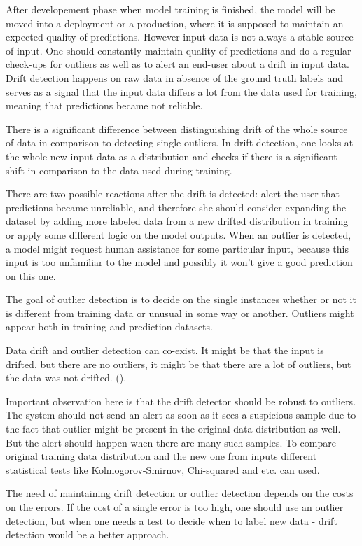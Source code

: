 After developement phase when model training is finished, the model will be moved into a deployment or a production, where it is supposed to maintain an expected quality of predictions. However input data is not always a stable source of input. One should constantly maintain quality of predictions and do a regular check-ups for outliers as well as to alert an end-user about a drift in input data. Drift detection happens on raw data in absence of the ground truth labels and serves as a signal that the input data differs a lot from the data used for training, meaning that predictions became not reliable.

There is a significant difference between distinguishing drift of the whole source of data in comparison to detecting single outliers. In drift detection, one looks at the whole new input data as a distribution and checks if there is a significant shift in comparison to the data used during training.

There are two possible reactions after the drift is detected: alert the user that predictions became unreliable, and therefore she should consider expanding the dataset by adding more labeled data from a new drifted distribution in training or apply some different logic on the model outputs. When an outlier is detected, a model might request human assistance for some particular input, because this input is too unfamiliar to the model and possibly it won't give a good prediction on this one.

The goal of outlier detection is to decide on the single instances whether or not it is different from training data or unusual in some way or another. Outliers might appear both in training and prediction datasets.

Data drift and outlier detection can co-exist. It might be that the input is drifted, but there are no outliers, it might be that there are a lot of outliers, but the data was not drifted. (\cite{samuylova_2021}).

Important observation here is that the drift detector should be robust to outliers. The system should not send an alert as soon as it sees a suspicious sample due to the fact that outlier might be present in the original data distribution as well. But the alert should happen when there are many such samples. To compare original training data distribution and the new one from inputs different statistical tests like Kolmogorov-Smirnov, Chi-squared and etc. can used.

The need of maintaining drift detection or outlier detection depends on the costs on the errors. If the cost of a single error is too high, one should use an outlier detection, but when one needs a test to decide when to label new data - drift detection would be a better approach.

